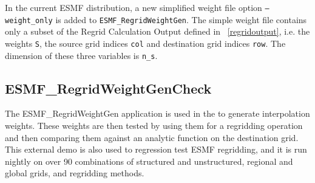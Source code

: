 In the current ESMF distribution, a new simplified weight file option {\tt --weight\_only} is added to {\tt ESMF\_RegridWeightGen}.  
The simple weight file contains only a subset of the Regrid Calculation Output defined in ~\ref{regridoutput}, i.e. 
the weights {\tt S}, the source grid indices {\tt col} and destination grid indices {\tt row}.  The dimension of these three variables is {\tt n\_s}.

\subsection{ESMF\_RegridWeightGenCheck}\label{sec:regridweightgencheck}

The ESMF\_RegridWeightGen application is used in the
 to generate interpolation weights.  These weights are then tested by using them for a regridding operation and then comparing them against an analytic function on the destination grid.  This external demo is also used to regression test ESMF regridding, and it is run nightly on over 90 combinations of structured and unstructured, regional and global grids, and regridding methods.
